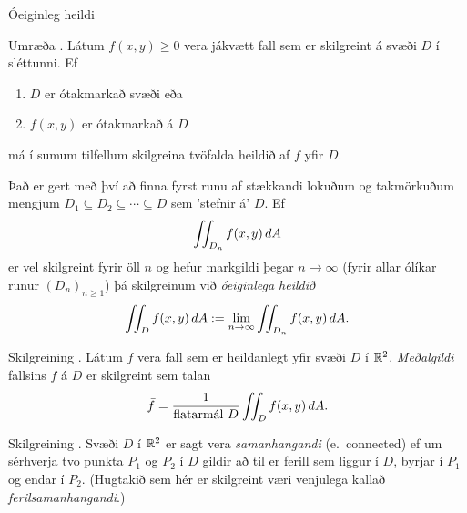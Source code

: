 \begin{frame}{Óeiginleg heildi}
 \begin {block}{Umræða \kaflanr.}
  Látum $f(x,y)\geq 0$ vera jákvætt fall sem er skilgreint á svæði $D$ í sléttunni. Ef
  \begin {enumerate}
   \item $D$ er ótakmarkað svæði eða
   \item $f(x,y)$ er ótakmarkað á $D$
  \end {enumerate}
má í sumum tilfellum skilgreina tvöfalda heildið af $f$ yfir $D$.

\medskip
Það er gert með því að finna fyrst runu af stækkandi lokuðum og takmörkuðum mengjum $D_1 \subseteq D_2 \subseteq \cdots \subseteq D$ sem 'stefnir á' $D$. Ef
\begin {equation*}
\int\!\!\!\int_{D_n} f(x,y)\,dA
\end {equation*}
er vel skilgreint fyrir öll $n$ og hefur markgildi þegar $n\to \infty$ (fyrir allar ólíkar runur $(D_n)_{n\geq 1}$) þá 
skilgreinum við \emph{óeiginlega heildið}
\begin {equation*}
 \int\!\!\!\int_{D} f(x,y)\,dA := \lim_{n\to \infty} \int\!\!\!\int_{D_n} f(x,y)\,dA .
\end {equation*}

\end {block}

\end{frame}




\begin{frame}{} 

\begin {block}{Skilgreining \kaflanr.}
 Látum $f$ vera fall sem er heildanlegt yfir svæði $D$ í ${\mathbb R}^2$.  {\em Meðalgildi} fallsins $f$ á $D$ er skilgreint sem talan 
$$\bar{f}=\frac{1}{\mbox{flatarmál }D}\int\!\!\!\int_D f(x,y)\,dA.$$ 
\end{block}

\end{frame}



\begin{frame}{} 

\begin {block}{Skilgreining \kaflanr.}
Svæði $D$ í ${\mathbb R}^2$ er sagt vera {\em
  samanhangandi} (e.~connected) ef um sérhverja tvo punkta $P_1$ og $P_2$ í $D$
gildir að til er ferill sem liggur í $D$, byrjar í $P_1$ og endar í
$P_2$.  (Hugtakið sem hér er skilgreint væri venjulega kallað {\em
  ferilsamanhangandi}.) 
\end{block}

\end{frame}



